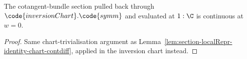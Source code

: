 \begin{lemma}
\label{lem:section-localRepr-inversion-chart-continuous-at-zero}
The cotangent-bundle section pulled back through
\(\code{inversionChart}.\code{symm}\) and evaluated at \(1:\C\) is
continuous at \(w=0\).
\leanok
\end{lemma}
\begin{proof}
\leanok
Same chart-trivialisation argument as
Lemma~\ref{lem:section-localRepr-identity-chart-contdiff}, applied
in the inversion chart instead.
\end{proof}
